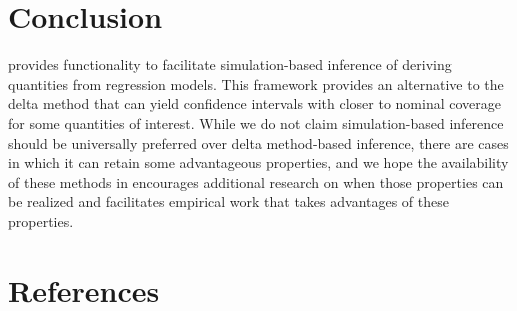 \section{Conclusion}\label{conclusion}

 provides functionality to facilitate simulation-based inference of deriving quantities from regression models. This framework provides an alternative to the delta method that can yield confidence intervals with closer to nominal coverage for some quantities of interest. While we do not claim simulation-based inference should be universally preferred over delta method-based inference, there are cases in which it can retain some advantageous properties, and we hope the availability of these methods in  encourages additional research on when those properties can be realized and facilitates empirical work that takes advantages of these properties.

\section*{References}\label{references}

